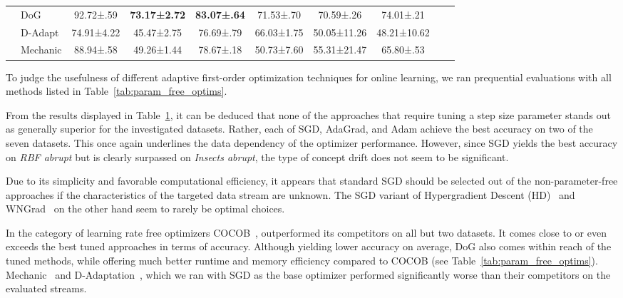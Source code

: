 \documentclass[runningheads]{llncs}
\begin{document}
\begin{table}[ht]
\begin{tabular}{llcccccccc}
		                                                   & DoG \cite{ivgiDoGSGDBest2023}                                                     & 92.72±.59           & \bfseries 73.17±2.72 & \bfseries 83.07±.64   & 71.53±.70            & 70.59±.26           & 74.01±.21           \\
		                                                   & D-Adapt                    \cite{defazioLearningRateFreeLearningDAdaptation2023a} & 74.91±4.22          & 45.47±2.75           & 76.69±.79             & 66.03±1.75           & 50.05±11.26         & 48.21±10.62         \\
		                                                   & Mechanic \cite{cutkoskyMechanicLearningRate2023}                                  & 88.94±.58           & 49.26±1.44           & 78.67±.18             & 50.73±7.60           & 55.31±21.47         & 65.80±.53           \\
		\bottomrule
	\end{tabular}
	\label{tab:results_adaptive_optims}
\end{table}

To judge the usefulness of different adaptive first-order optimization techniques for online learning, we ran prequential evaluations with all methods listed in Table~\ref{tab:param_free_optims}.

From the results displayed in Table~\ref{tab:results_adaptive_optims}, it can be deduced that none of the approaches that require tuning a step size parameter stands out as generally superior for the investigated datasets.
Rather, each of SGD, AdaGrad, and Adam achieve the best accuracy on two of the seven datasets.
This once again underlines the data dependency of the optimizer performance.
However, since SGD yields the best accuracy on \textit{RBF abrupt} but is clearly surpassed on \textit{Insects abrupt}, the type of concept drift does not seem to be significant.

Due to its simplicity and favorable computational efficiency, it appears that standard SGD should be selected out of the non-parameter-free approaches if the characteristics of the targeted data stream are unknown.
The SGD variant of Hypergradient Descent (HD)~\cite{baydinOnlineLearningRate2018} and WNGrad~\cite{wuWNGradLearnLearning2020} on the other hand seem to rarely be optimal choices.

In the category of learning rate free optimizers COCOB~\cite{orabonaTrainingDeepNetworks2017}, outperformed its competitors on all but two datasets.
It comes close to or even exceeds the best tuned approaches in terms of accuracy.
Although yielding lower accuracy on average, DoG also comes within reach of the tuned methods, while offering much better runtime and memory efficiency compared to COCOB (see Table~\ref{tab:param_free_optims}).
Mechanic~\cite{cutkoskyMechanicLearningRate2023} and D-Adaptation~\cite{defazioLearningRateFreeLearningDAdaptation2023a}, which we ran with SGD as the base optimizer performed significantly worse than their competitors on the evaluated streams.
\end{document}
